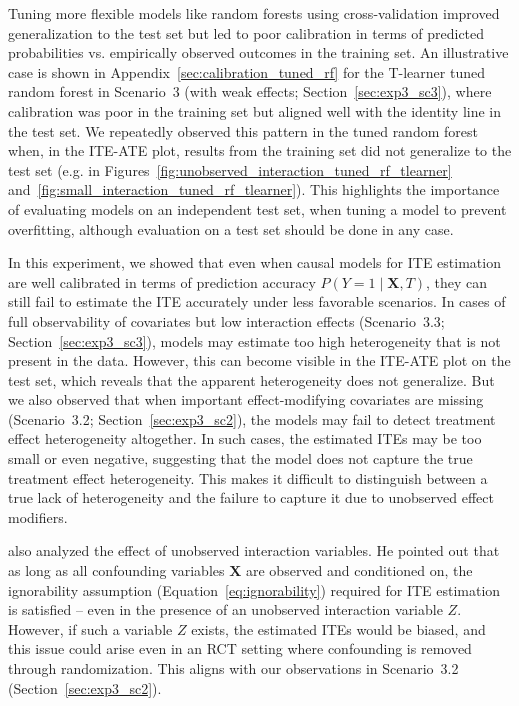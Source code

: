 Tuning more flexible models like random forests using cross-validation improved generalization to the test set but led to poor calibration in terms of predicted probabilities vs. empirically observed outcomes in the training set. An illustrative case is shown in Appendix~\ref{sec:calibration_tuned_rf} for the T-learner tuned random forest in Scenario~3 (with weak effects; Section~\ref{sec:exp3_sc3}), where calibration was poor in the training set but aligned well with the identity line in the test set. We repeatedly observed this pattern in the tuned random forest when, in the ITE-ATE plot, results from the training set did not generalize to the test set (e.g. in Figures~\ref{fig:unobserved_interaction_tuned_rf_tlearner} and~\ref{fig:small_interaction_tuned_rf_tlearner}). This highlights the importance of evaluating models on an independent test set, when tuning a model to prevent overfitting, although evaluation on a test set should be done in any case.

\medskip

In this experiment, we showed that even when causal models for ITE estimation are well calibrated in terms of prediction accuracy $P(Y = 1 \mid \mathbf{X}, T)$, they can still fail to estimate the ITE accurately under less favorable scenarios. In cases of full observability of covariates but low interaction effects (Scenario~3.3; Section~\ref{sec:exp3_sc3}), models may estimate too high heterogeneity that is not present in the data. However, this can become visible in the ITE-ATE plot on the test set, which reveals that the apparent heterogeneity does not generalize. 
But we also observed that when important effect-modifying covariates are missing (Scenario~3.2; Section~\ref{sec:exp3_sc2}), the models may fail to detect treatment effect heterogeneity altogether. In such cases, the estimated ITEs may be too small or even negative, suggesting that the model does not capture the true treatment effect heterogeneity. This makes it difficult to distinguish between a true lack of heterogeneity and the failure to capture it due to unobserved effect modifiers.


\citet{vegetabile2021} also analyzed the effect of unobserved interaction variables. He pointed out that as long as all confounding variables $\mathbf{X}$ are observed and conditioned on, the ignorability assumption (Equation~\ref{eq:ignorability}) required for ITE estimation is satisfied -- even in the presence of an unobserved interaction variable $Z$. However, if such a variable $Z$ exists, the estimated ITEs would be biased, and this issue could arise even in an RCT setting where confounding is removed through randomization. This aligns with our observations in Scenario~3.2 (Section~\ref{sec:exp3_sc2}).


